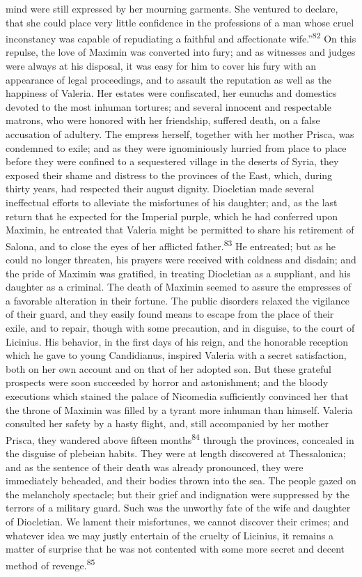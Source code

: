 mind were still expressed by her mourning garments. She ventured
to declare, that she could place very little confidence in the
professions of a man whose cruel inconstancy was capable of
repudiating a faithful and affectionate wife.”\textsuperscript{82} On this
repulse, the love of Maximin was converted into fury; and as
witnesses and judges were always at his disposal, it was easy for
him to cover his fury with an appearance of legal proceedings,
and to assault the reputation as well as the happiness of
Valeria. Her estates were confiscated, her eunuchs and domestics
devoted to the most inhuman tortures; and several innocent and
respectable matrons, who were honored with her friendship,
suffered death, on a false accusation of adultery. The empress
herself, together with her mother Prisca, was condemned to exile;
and as they were ignominiously hurried from place to place before
they were confined to a sequestered village in the deserts of
Syria, they exposed their shame and distress to the provinces of
the East, which, during thirty years, had respected their august
dignity. Diocletian made several ineffectual efforts to alleviate
the misfortunes of his daughter; and, as the last return that he
expected for the Imperial purple, which he had conferred upon
Maximin, he entreated that Valeria might be permitted to share
his retirement of Salona, and to close the eyes of her afflicted
father.\textsuperscript{83} He entreated; but as he could no longer threaten, his
prayers were received with coldness and disdain; and the pride of
Maximin was gratified, in treating Diocletian as a suppliant, and
his daughter as a criminal. The death of Maximin seemed to assure
the empresses of a favorable alteration in their fortune. The
public disorders relaxed the vigilance of their guard, and they
easily found means to escape from the place of their exile, and
to repair, though with some precaution, and in disguise, to the
court of Licinius. His behavior, in the first days of his reign,
and the honorable reception which he gave to young Candidianus,
inspired Valeria with a secret satisfaction, both on her own
account and on that of her adopted son. But these grateful
prospects were soon succeeded by horror and astonishment; and the
bloody executions which stained the palace of Nicomedia
sufficiently convinced her that the throne of Maximin was filled
by a tyrant more inhuman than himself. Valeria consulted her
safety by a hasty flight, and, still accompanied by her mother
Prisca, they wandered above fifteen months\textsuperscript{84} through the
provinces, concealed in the disguise of plebeian habits. They
were at length discovered at Thessalonica; and as the sentence of
their death was already pronounced, they were immediately
beheaded, and their bodies thrown into the sea. The people gazed
on the melancholy spectacle; but their grief and indignation were
suppressed by the terrors of a military guard. Such was the
unworthy fate of the wife and daughter of Diocletian. We lament
their misfortunes, we cannot discover their crimes; and whatever
idea we may justly entertain of the cruelty of Licinius, it
remains a matter of surprise that he was not contented with some
more secret and decent method of revenge.\textsuperscript{85}

